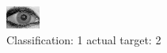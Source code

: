 \begin{figure}[h!]
\begin{center}
\includegraphics[width=0.60\columnwidth]{figures/ID2004_class_1_target_2.png}
\end{center}
\caption{ Classification: 1 actual target: 2}
\label{fig:ID2004_class_1_target_2}
\end{figure}
